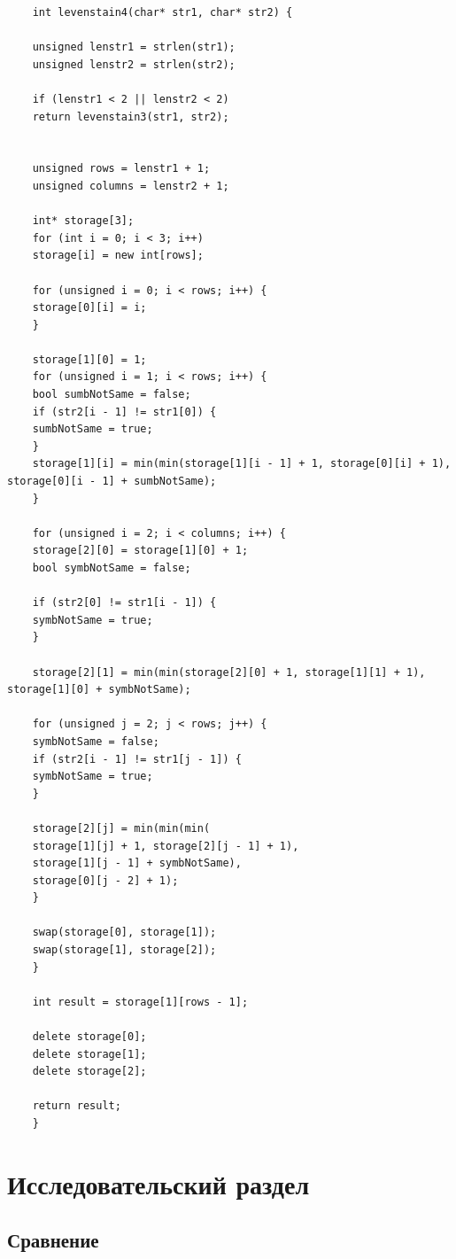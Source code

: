 \documentclass[a4paper, 14pt]{article}
\begin{document}
	\begin{lstlisting}
	int levenstain4(char* str1, char* str2) {
	
	unsigned lenstr1 = strlen(str1);
	unsigned lenstr2 = strlen(str2);
	
	if (lenstr1 < 2 || lenstr2 < 2)
	return levenstain3(str1, str2);
	
	
	unsigned rows = lenstr1 + 1;
	unsigned columns = lenstr2 + 1;
	
	int* storage[3];
	for (int i = 0; i < 3; i++)
	storage[i] = new int[rows];
	
	for (unsigned i = 0; i < rows; i++) {
	storage[0][i] = i;
	}
	
	storage[1][0] = 1;
	for (unsigned i = 1; i < rows; i++) {
	bool sumbNotSame = false;
	if (str2[i - 1] != str1[0]) {
	sumbNotSame = true;
	}
	storage[1][i] = min(min(storage[1][i - 1] + 1, storage[0][i] + 1), storage[0][i - 1] + sumbNotSame);
	}
	
	for (unsigned i = 2; i < columns; i++) {
	storage[2][0] = storage[1][0] + 1;
	bool symbNotSame = false;
	
	if (str2[0] != str1[i - 1]) {
	symbNotSame = true;
	}
	
	storage[2][1] = min(min(storage[2][0] + 1, storage[1][1] + 1), storage[1][0] + symbNotSame);
	
	for (unsigned j = 2; j < rows; j++) {
	symbNotSame = false;
	if (str2[i - 1] != str1[j - 1]) {
	symbNotSame = true;
	}
	
	storage[2][j] = min(min(min(
	storage[1][j] + 1, storage[2][j - 1] + 1),
	storage[1][j - 1] + symbNotSame),
	storage[0][j - 2] + 1);
	}
	
	swap(storage[0], storage[1]);
	swap(storage[1], storage[2]);
	}
	
	int result = storage[1][rows - 1];
	
	delete storage[0];
	delete storage[1];
	delete storage[2];
	
	return result;
	}
	\end{lstlisting}
	
	
	
	\newpage
	\section{Исследовательский раздел}
	
	\subsection{Сравнение}
	
\end{document}
